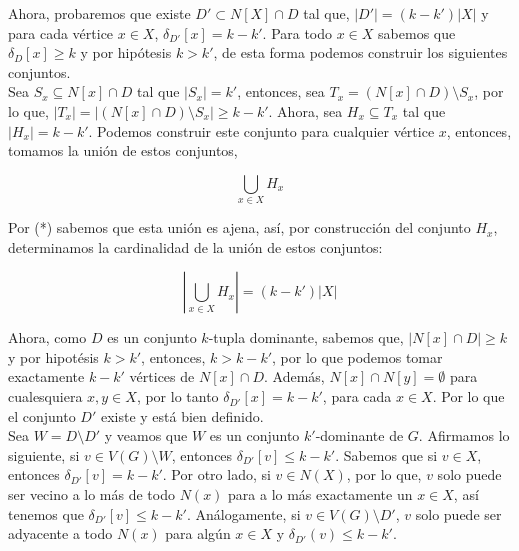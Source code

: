 \documentclass{article}
\begin{document}



Ahora, probaremos que existe $D'\subset N[X] \cap D$ tal que, $|D'| = (k-k')|X|$ y para cada vértice $x \in X$, $\delta_{D'}[x] = k-k'$. Para todo $x \in X$ sabemos que $\delta_{D}[x] \geq k$ y por hipótesis $k > k'$, de esta forma podemos construir los siguientes conjuntos.\\

Sea $S_{x} \subseteq N[x] \cap D$ tal que $|S_{x}| = k'$, entonces, sea $T_{x} = (N[x] \cap D) \setminus S_{x}$, por lo que, $|T_{x}| = |(N[x] \cap D) \setminus S_{x}| \geq k - k'$. Ahora, sea $H_{x} \subseteq T_{x}$ tal que $|H_{x}| = k - k'$. Podemos construir este conjunto para cualquier vértice $x$, entonces, tomamos la unión de estos conjuntos,

$$ \bigcup\limits_{x \in X} H_{x} $$

Por (*) sabemos que esta unión es ajena, así, por construcción del conjunto $H_x$, determinamos la cardinalidad de la unión de estos conjuntos: 

$$|\bigcup\limits_{x \in X} H_{x}| = (k - k')|X|$$

Ahora, como $D$ es un conjunto $k$-tupla dominante, sabemos que, $|N[x]\cap D|\ge k$ y por hipotésis $k>k'$, entonces, $k>k-k'$, por lo que podemos tomar exactamente $k-k'$ vértices de $N[x]\cap D$. Además, $N[x]\cap N[y] = \emptyset$ para cualesquiera $x,y \in X$, por lo tanto $\delta_{D'}[x]=k-k'$, para cada $x \in X$. Por lo que el conjunto $D'$ existe y está bien definido.\\

Sea $W=D\setminus D'$ y veamos que $W$ es un conjunto $k'$-dominante de $G$. Afirmamos lo siguiente, si $v \in V(G)\setminus W$, entonces $\delta_{D'}[v]\le k-k'$. Sabemos que si $v\in X$, entonces $\delta_{D'}[v]= k-k'$. Por otro lado, si $v \in N(X)$, por lo que, $v$ solo puede ser vecino a lo más de todo $N(x)$ para a lo más exactamente un $x \in X$, así tenemos que $\delta_{D'}[v]\le k-k'$. Análogamente, si $v\in V(G) \setminus D'$, $v$ solo puede ser adyacente a todo $N(x)$ para algún $x \in X$ y $\delta_{D'}(v)\le k-k'$.\\
\end{document}
